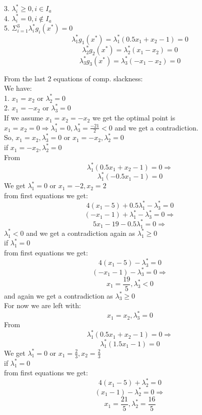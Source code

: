\documentclass[12pt]{article}
\begin{document}
3. $\lambda_i^* \geq 0, i \in I_a$\\

4. $\lambda_i^* = 0, i \notin I_a$\\

5. $\Sigma_{i=1}^3\lambda_i^*g_i(x^*) = 0$\\
$$ \lambda_1^*g_1(x^*) = \lambda_1^*(0.5x_1 +x_2 -1) = 0$$
$$ \lambda_2^*g_2(x^*) = \lambda_2^*(x_1 -x_2) = 0$$
$$ \lambda_3^*g_3(x^*) = \lambda_3^*(-x_1 -x_2) = 0$$

From the last 2 equations of comp. slackness:\\
We have:\\
1. $x_1=x_2$ or $\lambda_2^*=0$\\
2. $x_1=-x_2$ or $\lambda_3^*=0$\\

If we assume $x_1=x_2 = -x_2$ we get the optimal point is $x_1=x_2=0 \Rightarrow \lambda^*_1 = 0, \lambda^*_3 = \frac{-21}{2} <0$ and we get a contradiction.\\

So, $x_1=x_2,\lambda^*_3=0$ or $x_1=-x_2,\lambda^*_2=0$\\

if $x_1=-x_2,\lambda^*_2=0$\\
From $$\lambda_1^*(0.5x_1 +x_2 -1) = 0\Rightarrow$$
$$\lambda_1^*(-0.5x_1 -1) = 0$$
We get $\lambda_1^*=0$ or $x_1=-2, x_2=2$\\
from first equations we get:\\
$$4(x_1-5) + 0.5\lambda^*_1 -\lambda^*_3 = 0$$
$$(-x_1-1) + \lambda^*_1 -\lambda^*_3 = 0 \Rightarrow$$
$$5x_1-19 - 0.5\lambda^*_1 = 0\Rightarrow$$
$\lambda^*_1<0$ and we get a contradiction again as $\lambda^*_1\geq 0$\\

if $\lambda^*_1=0$\\
from first equations we get:\\
$$4(x_1-5) -\lambda^*_3 = 0$$
$$(-x_1-1) -\lambda^*_3 = 0 \Rightarrow$$
$$x_1=\frac{19}{5}, \lambda^*_3 <0$$ and again we get a contradiction as $\lambda^*_3\geq 0$\\

For now we are left with:\\
$$x_1=x_2,\lambda^*_3=0$$
From $$\lambda^*_1(0.5x_1 +x_2 -1) = 0\Rightarrow$$
$$\lambda^*_1(1.5x_1 -1) = 0$$
We get $\lambda^*_1=0$ or $x_1=\frac{2}{3}, x_2=\frac{2}{3}$\\

if $\lambda^*_1=0$\\
from first equations we get:\\
$$4(x_1-5) +\lambda^*_2 = 0$$
$$(x_1-1) -\lambda^*_2 = 0 \Rightarrow$$
$$x_1=\frac{21}{5}, \lambda^*_2 = \frac{16}{5}$$
\end{document}
